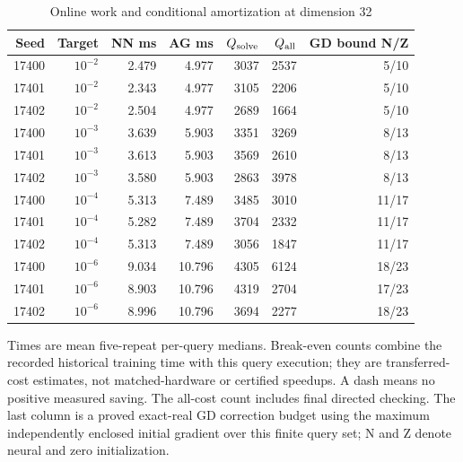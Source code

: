 \begin{table}[htbp]
\centering\small
\caption{Online work and conditional amortization at dimension 32}\label{tab:r19timing32}
\begin{tabular}{rrrrrrr}\toprule
Seed & Target & NN ms & AG ms & $Q_{\rm solve}$ & $Q_{\rm all}$ & GD bound N/Z\\
\midrule
17400 & $10^{-2}$ & 2.479 & 4.977 & 3037 & 2537 & 5/10\\
17401 & $10^{-2}$ & 2.343 & 4.977 & 3105 & 2206 & 5/10\\
17402 & $10^{-2}$ & 2.504 & 4.977 & 2689 & 1664 & 5/10\\
17400 & $10^{-3}$ & 3.639 & 5.903 & 3351 & 3269 & 8/13\\
17401 & $10^{-3}$ & 3.613 & 5.903 & 3569 & 2610 & 8/13\\
17402 & $10^{-3}$ & 3.580 & 5.903 & 2863 & 3978 & 8/13\\
17400 & $10^{-4}$ & 5.313 & 7.489 & 3485 & 3010 & 11/17\\
17401 & $10^{-4}$ & 5.282 & 7.489 & 3704 & 2332 & 11/17\\
17402 & $10^{-4}$ & 5.313 & 7.489 & 3056 & 1847 & 11/17\\
17400 & $10^{-6}$ & 9.034 & 10.796 & 4305 & 6124 & 18/23\\
17401 & $10^{-6}$ & 8.903 & 10.796 & 4319 & 2704 & 17/23\\
17402 & $10^{-6}$ & 8.996 & 10.796 & 3694 & 2277 & 18/23\\
\bottomrule
\end{tabular}
\par\smallskip\begin{minipage}{.98\textwidth}\footnotesize Times are mean five-repeat per-query medians. Break-even counts combine the recorded historical training time with this query execution; they are transferred-cost estimates, not matched-hardware or certified speedups. A dash means no positive measured saving. The all-cost count includes final directed checking. The last column is a proved exact-real GD correction budget using the maximum independently enclosed initial gradient over this finite query set; N and Z denote neural and zero initialization.\end{minipage}
\end{table}
